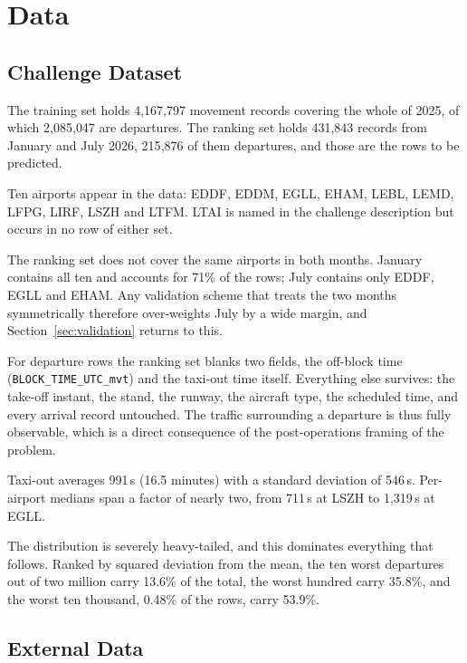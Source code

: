 \documentclass[
  manuscript=article,
  layout=preprint,
  year=2026,
  volume=x,
]{extra/joas}
\begin{document}
\section{Data}
\subsection{Challenge Dataset}
The training set holds 4{,}167{,}797 movement records covering the whole of 2025, of
which 2{,}085{,}047 are departures. The ranking set holds 431{,}843 records from January
and July 2026, 215{,}876 of them departures, and those are the rows to be predicted.

Ten airports appear in the data: EDDF, EDDM, EGLL, EHAM, LEBL, LEMD, LFPG, LIRF, LSZH and
LTFM. LTAI is named in the challenge description but occurs in no row of either set.

The ranking set does not cover the same airports in both months. January contains all ten
and accounts for 71\% of the rows; July contains only EDDF, EGLL and EHAM. Any validation
scheme that treats the two months symmetrically therefore over-weights July by a wide
margin, and Section~\ref{sec:validation} returns to this.

For departure rows the ranking set blanks two fields, the off-block time
(\texttt{BLOCK\_TIME\_UTC\_mvt}) and the taxi-out time itself. Everything else survives:
the take-off instant, the stand, the runway, the aircraft type, the scheduled time, and
every arrival record untouched. The traffic surrounding a departure is thus fully
observable, which is a direct consequence of the post-operations framing of the problem.

Taxi-out averages 991\,s (16.5 minutes) with a standard deviation of 546\,s. Per-airport
medians span a factor of nearly two, from 711\,s at LSZH to 1{,}319\,s at EGLL.

The distribution is severely heavy-tailed, and this dominates everything that follows.
Ranked by squared deviation from the mean, the ten worst departures out of two million
carry 13.6\% of the total, the worst hundred carry 35.8\%, and the worst ten thousand,
0.48\% of the rows, carry 53.9\%.

\subsection{External Data}
\end{document}
